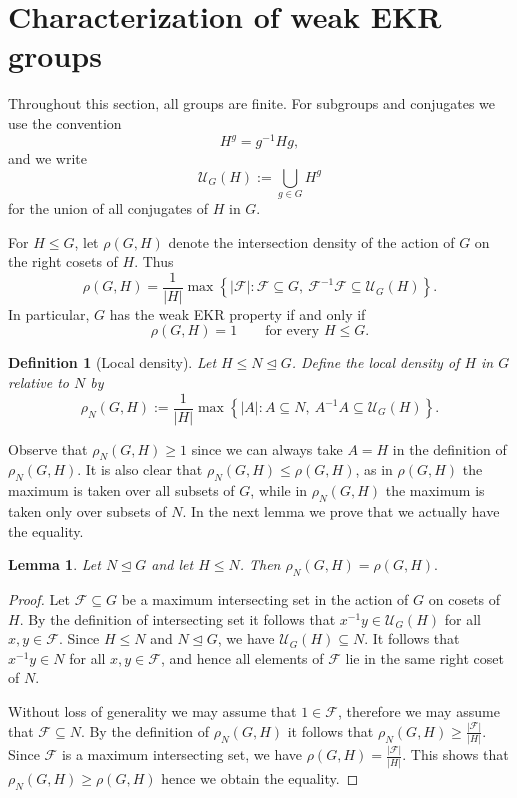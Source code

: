 \documentclass[11pt]{article}
\newtheorem{lemma}[theorem]{Lemma}
\newtheorem{definition}[theorem]{Definition}
\begin{document}
\section{Characterization of weak EKR groups}



Throughout this section, all groups are finite. For subgroups and
conjugates we use the convention
\[
H^g=g^{-1}Hg,
\]
and we write
\[
\mathcal{U}_G(H):=\bigcup_{g\in G}H^g
\]
for the union of all conjugates of \(H\) in \(G\).

For \(H\leq G\), let \(\rho(G,H)\) denote the intersection density of
the action of \(G\) on the right cosets of \(H\). Thus
\[
\rho(G,H)
 =
 \frac{1}{|H|}
 \max\left\{
 |\mathcal{F}|:
 \mathcal{F}\subseteq G,\ 
 \mathcal{F}^{-1}\mathcal{F}\subseteq \mathcal{U}_G (H)
 \right\}.
\]
In particular, \(G\) has the weak EKR property if and only if
\[
\rho(G,H)=1
\qquad\text{for every }H\leq G.
\]

\begin{definition}[Local density]
\label{def:local-defect}
Let \(H\leq N\trianglelefteq G\). Define the {local density of \(H\) in \(G\) relative to \(N\)} by
\[
\rho_N(G,H)
 :=\frac{1}{|H|}
 \max\left\{
 |A|:
 A\subseteq N,\ 
 A^{-1}A\subseteq \mathcal{U}_G(H)
 \right\}.
\]
 

\end{definition}

Observe that $\rho_N(G,H)\geq 1$ since we can always take \(A=H\) in the definition of
\(\rho_N(G,H)\). It is also clear that $\rho_N(G,H)\leq \rho(G,H)$, as in $\rho(G,H)$ the maximum is taken over all subsets of $G$, while in $\rho_N(G,H)$ the maximum is taken only over subsets of $N$. In the next lemma we prove that we actually have the equality.

\begin{lemma}
\label{lem:local-defect-realization}
Let \(N\trianglelefteq G\) and let \(H\leq N\). Then
\(
\rho_N(G,H)=\rho(G,H).
\)
\end{lemma}

\begin{proof}
Let \(\mathcal{F}\subseteq G\) be a maximum intersecting  set in the action of \(G\)
on cosets of \(H\). By the definition of intersecting set it follows that
\(
x^{-1}y\in \mathcal{U}_G(H)\)
for all \(x,y\in\mathcal{F}.
\)
Since \(H\leq N\) and \(N\trianglelefteq G\), we have
\(
\mathcal{U}_G(H)\subseteq N.
\)
It follows that \(x^{-1}y\in N\) for all \(x,y\in\mathcal{F}\), and
hence all elements of \(\mathcal{F}\) lie in the same right coset of
\(N\).

Without loss of generality we may assume that $1\in \mathcal{F}$, therefore we may assume that
\(\mathcal{F}\subseteq N\). By the definition of $\rho_N(G,H)$ it follows that $\rho_N(G,H)\geq \frac{|\mathcal{F}|}{|H|}$. Since $\mathcal{F}$ is a maximum intersecting set, we have 
$\rho(G,H)=\frac{|\mathcal{F}|}{|H|}$. 
This shows that $\rho_N(G,H)\geq \rho(G,H)$ hence we obtain the equality.
\end{proof}
\end{document}
